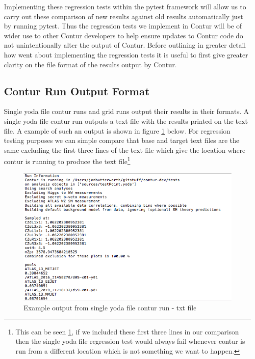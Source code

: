 Implementing these regression tests within the pytest framework will allow us to carry out these comparison of new results against old results automatically just by running pytest. Thus the regression tests we implement in Contur will be of wider use to other Contur developers to help ensure updates to Contur code do not unintentionally alter the output of Contur. Before outlining in greater detail how went about implementing the regression tests it is useful to first give greater clarity on the file format of the results output by Contur.

\subsection{Contur Run Output Format}
Single yoda file contur runs and grid runs output their results in their formats. A single yoda file contur run outputs a text file with the results printed on the text file. A example of such an output is shown in figure \ref{fig:contur_txt_output} below. For regression testing purposes we can simple compare that base and target text files are the same excluding the first three lines of the text file which give the location where contur is running to produce the text file\footnote{This can be seen \ref{fig:contur_txt_output}, if we included these first three lines in our comparison then the single yoda file regression test would always fail whenever contur is run from a different location which is not something we want to happen.}

\begin{figure}[H]
\centering
\includegraphics[scale=0.6]{plots/single_yoda_run.png}
\caption{Example output from single yoda file contur run - txt file}
\label{fig:contur_txt_output}
\end{figure}

